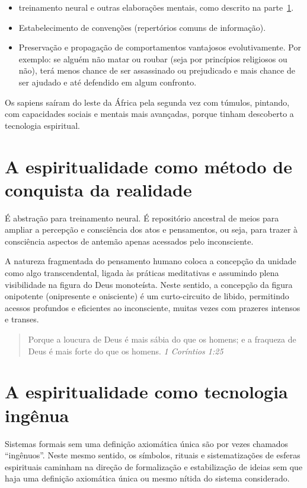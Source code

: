 \documentclass[a4paper]{article}
\begin{document}
\begin{itemize}
  \item treinamento neural e outras elaborações mentais, como descrito na
  parte~\ref{met}.

  \item Estabelecimento de convenções (repertórios comuns de informação).

  \item Preservação e propagação de comportamentos vantajosos evolutivamente.
  Por exemplo: se alguém não matar ou roubar (seja por princípios religiosos ou
  não), terá menos chance de ser assassinado ou prejudicado e mais chance de ser
  ajudado e até defendido em algum confronto.
\end{itemize}

\qquad Os sapiens saíram do leste da África pela segunda vez com túmulos,
pintando, com capacidades sociais e mentais mais avançadas, porque tinham
descoberto a tecnologia espiritual.

\section{A espiritualidade como método de conquista da realidade}\label{met}

\qquad É abstração para treinamento neural. É repositório ancestral de meios
para ampliar a percepção e consciência dos atos e pensamentos, ou seja, para
trazer à consciência aspectos de antemão apenas acessados pelo inconsciente.

A natureza fragmentada do pensamento humano coloca a concepção da unidade como
algo transcendental, ligada às práticas meditativas e assumindo plena
visibilidade na figura do Deus monoteísta. Neste sentido, a concepção da figura
onipotente (onipresente e onisciente) é um curto-circuito de libido, permitindo
acessos profundos e eficientes ao inconsciente, muitas vezes com prazeres
intensos e transes.

\begin{quotation}
  Porque a loucura de Deus é mais sábia do que os homens; e a fraqueza de Deus é
  mais forte do que os homens. \textit{1 Coríntios 1:25}
\end{quotation}

\section{A espiritualidade como tecnologia ingênua}

\qquad Sistemas formais sem uma definição axiomática única são por vezes
chamados ``ingênuos''. Neste mesmo sentido, os símbolos, rituais e
sistematizações de esferas espirituais caminham na direção de formalização e
estabilização de ideias sem que haja uma definição axiomática única ou mesmo
nítida do sistema considerado.
\end{document}
